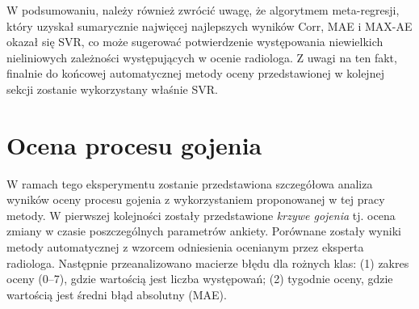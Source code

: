 W podsumowaniu, należy również zwrócić uwagę, że algorytmem meta-regresji, który uzyskał sumarycznie najwięcej najlepszych wyników Corr, MAE i MAX-AE okazał się SVR, co może sugerować potwierdzenie występowania niewielkich nieliniowych zależności występujących w ocenie radiologa. Z uwagi na ten fakt, finalnie do końcowej automatycznej metody oceny przedstawionej w kolejnej sekcji zostanie wykorzystany właśnie SVR.

\section{Ocena procesu gojenia}

W ramach tego eksperymentu zostanie przedstawiona szczegółowa analiza wyników oceny procesu gojenia z wykorzystaniem proponowanej w tej pracy metody. W pierwszej kolejności zostały przedstawione \textit{krzywe gojenia} tj. ocena zmiany w czasie poszczególnych parametrów ankiety. Porównane zostały wyniki metody automatycznej z wzorcem odniesienia ocenianym przez eksperta radiologa. Następnie przeanalizowano macierze błędu dla rożnych klas: (1) zakres oceny (0--7), gdzie wartością jest liczba występowań; (2) tygodnie oceny, gdzie wartością jest średni błąd absolutny (MAE).

